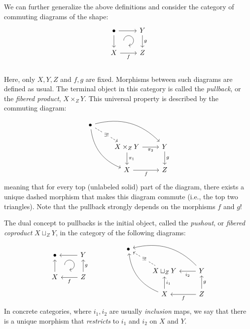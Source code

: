 %
\begin{defn}[Pullback]\label{pullbacks}
We can further generalize the above definitions and consider the
category of commuting diagrams of the shape: \[\begin{tikzcd}[every matrix/.append style={name=m},   
execute at end picture={\draw [<-] ([xshift=-7mm,yshift=1mm]m-2-2.north) arc[start angle=-90,delta angle=270,radius=0.25cm];}]
   \bullet \arrow[r]\arrow[d]& Y\arrow[d,"g"] \\
   X\arrow[r,swap,"f"]& Z\\
\end{tikzcd}\]
Here, only $X,Y,Z$ and $f,g$ are fixed. Morphisms between such diagrams
are defined as usual. The terminal object in this category is called
the \emph{pullback}, or the \emph{fibered product}, $X\times_{Z}Y$.
This universal property is described by the commuting diagram:\[\begin{tikzcd}
  \bullet   \arrow[drr, bend left]   \arrow[ddr, bend right]   \arrow[dr, dashed,"\exists!" description] & & \\
    & X \times_Z Y \arrow[r,swap, "\pi_2"] \arrow[d, "\pi_1"]       & Y \arrow[d, "g"] \\ & X \arrow[r,swap, "f"] &Z 
\end{tikzcd}\]meaning that for every top (unlabeled solid) part of the diagram,
there exists a unique dashed morphism that makes this diagram commute
(i.e., the top two triangles). Note that the pullback strongly depends
on the morphisms $f$ and $g$!
\end{defn}
%
\begin{defn}[Pushouts]\label{pushouts}
The dual concept to pullbacks is the initial object, called the \emph{pushout}, or \emph{fibered coproduct} $X\sqcup_{Z}Y$, in the category of the following diagrams:
\[\begin{tikzcd}[every matrix/.append style={name=m},   
execute at end picture={\draw [<-] ([xshift=-7mm,yshift=1mm]m-2-2.north) arc[start angle=-90,delta angle=270,radius=0.25cm];}]
   \bullet \arrow[r,leftarrow]\arrow[d,leftarrow]& Y\arrow[d,leftarrow,"g"] \\
   X\arrow[r,,leftarrow,swap,"f"]& Z\\
\end{tikzcd}\quad\quad\quad\quad\quad
\begin{tikzcd}
  \bullet   \arrow[drr,leftarrow, bend left]   \arrow[ddr,leftarrow, bend right]   \arrow[dr,leftarrow, dashed,"\exists!" description] & & \\
    & X \sqcup_Z Y \arrow[r,leftarrow,swap, "i_2"] \arrow[d,leftarrow, "i_1"]       & Y \arrow[d,leftarrow, "g"] \\ & X \arrow[r,leftarrow,swap, "f"] &Z 
\end{tikzcd}
\]
In concrete categories, where $i_1,i_2$ are usually \emph{inclusion} maps, we say that there is a unique morphism that \emph{restricts} to $i_1$ and $i_2$ on $X$ and $Y$.
\end{defn}
